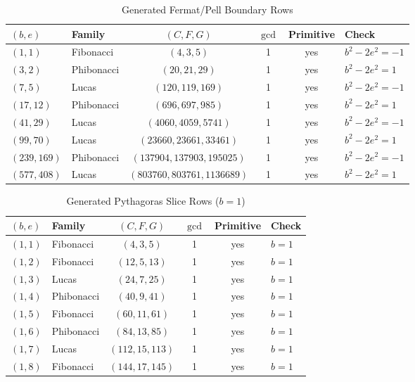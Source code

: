 \documentclass[12pt]{article}
\begin{document}
\begin{table}[h!]
\centering
\caption{Generated Fermat/Pell Boundary Rows}
\label{tab:appendix_fermat_pell}
\small
\begin{tabular}{llcccl}
\toprule
\textbf{$(b,e)$} & \textbf{Family} & \textbf{$(C,F,G)$} & \textbf{$\gcd$} & \textbf{Primitive} & \textbf{Check} \\
\midrule
$(1,1)$ & Fibonacci & $(4,3,5)$ & 1 & yes & $b^2-2e^2=-1$ \\
$(3,2)$ & Phibonacci & $(20,21,29)$ & 1 & yes & $b^2-2e^2=1$ \\
$(7,5)$ & Lucas & $(120,119,169)$ & 1 & yes & $b^2-2e^2=-1$ \\
$(17,12)$ & Phibonacci & $(696,697,985)$ & 1 & yes & $b^2-2e^2=1$ \\
$(41,29)$ & Lucas & $(4060,4059,5741)$ & 1 & yes & $b^2-2e^2=-1$ \\
$(99,70)$ & Lucas & $(23660,23661,33461)$ & 1 & yes & $b^2-2e^2=1$ \\
$(239,169)$ & Phibonacci & $(137904,137903,195025)$ & 1 & yes & $b^2-2e^2=-1$ \\
$(577,408)$ & Lucas & $(803760,803761,1136689)$ & 1 & yes & $b^2-2e^2=1$ \\
\bottomrule
\end{tabular}
\end{table}

\begin{table}[h!]
\centering
\caption{Generated Pythagoras Slice Rows ($b=1$)}
\label{tab:appendix_pythagoras}
\small
\begin{tabular}{llcccl}
\toprule
\textbf{$(b,e)$} & \textbf{Family} & \textbf{$(C,F,G)$} & \textbf{$\gcd$} & \textbf{Primitive} & \textbf{Check} \\
\midrule
$(1,1)$ & Fibonacci & $(4,3,5)$ & 1 & yes & $b=1$ \\
$(1,2)$ & Fibonacci & $(12,5,13)$ & 1 & yes & $b=1$ \\
$(1,3)$ & Lucas & $(24,7,25)$ & 1 & yes & $b=1$ \\
$(1,4)$ & Phibonacci & $(40,9,41)$ & 1 & yes & $b=1$ \\
$(1,5)$ & Fibonacci & $(60,11,61)$ & 1 & yes & $b=1$ \\
$(1,6)$ & Phibonacci & $(84,13,85)$ & 1 & yes & $b=1$ \\
$(1,7)$ & Lucas & $(112,15,113)$ & 1 & yes & $b=1$ \\
$(1,8)$ & Fibonacci & $(144,17,145)$ & 1 & yes & $b=1$ \\
\bottomrule
\end{tabular}
\end{table}
\end{document}
